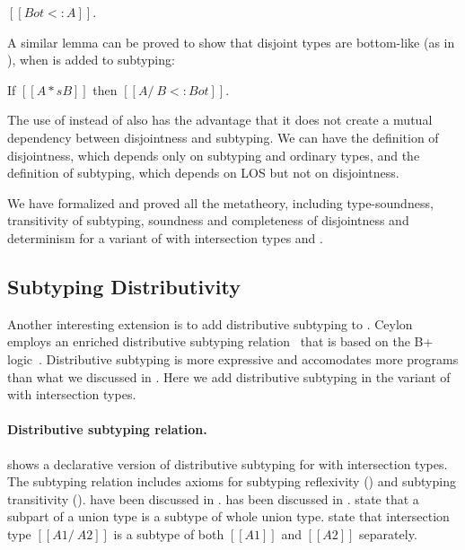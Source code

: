 \begin{lemma}
  $[[Bot <: A]]$.
\label{lemma:discussion:bls}
\end{lemma}

\noindent A similar lemma can be proved to show that disjoint types are bottom-like
(as in ), when  is added to subtyping:

\begin{lemma}
  If $[[A *s B]]$ then $[[A /\ B <: Bot]]$.
\label{lemma:discussion:disjoint-types}
\end{lemma}

\noindent The use of  instead of  also has
the advantage that it does not create a mutual dependency between
disjointness and subtyping. We can have the definition of
disjointness, which depends only on subtyping and ordinary types, and
the definition of subtyping, which depends on LOS but not on
disjointness.

We have formalized and proved all the metatheory, including
type-soundness, transitivity of subtyping, soundness and completeness
of disjointness and determinism for a variant of \name with
intersection types and .

\subsection{Subtyping Distributivity}
\label{sec:inter:dist}

Another interesting extension is to add distributive subtyping to \cal.
Ceylon employs an enriched 
distributive subtyping relation~\cite{muehlboeck2018empowering}
that is based on the 
B+ logic~\cite{routley1972semantics,van2000minimal}.
Distributive subtyping is more expressive and accomodates more programs than what we discussed in
. Here we add distributive subtyping in the variant of \cal with
intersection types. 

\paragraph{Distributive subtyping relation.}
 shows a declarative version of distributive subtyping for
\cal with intersection types.
The subtyping relation includes
axioms for subtyping reflexivity () and
subtyping transitivity ().  have been
discussed in .  has been discussed in .
 state that a subpart of a union type is a subtype of whole union type.
 state that intersection type $[[A1 /\ A2]]$ is a subtype of both $[[A1]]$
and $[[A2]]$ separately.

